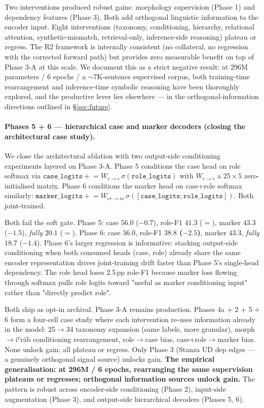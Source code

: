 \documentclass[10pt,a4paper,twocolumn]{article}
\begin{document}
\medskip
\noindent Two interventions produced robust gains: morphology supervision (Phase 1) and dependency features (Phase 3). Both add orthogonal linguistic information to the encoder input. Eight interventions (taxonomy, conditioning, hierarchy, relational attention, synthetic-mismatch, retrieval-only, inference-side reasoning) plateau or regress. The R2 framework is internally consistent (no collateral, no regression with the corrected forward path) but provides zero measurable benefit on top of Phase 3-A at this scale. We document this as a strict negative result: at 296M parameters / 6 epochs / a $\sim$7K-sentence supervised corpus, both training-time rearrangement and inference-time symbolic reasoning have been thoroughly explored, and the productive lever lies elsewhere --- in the orthogonal-information directions outlined in \S\ref{sec:future}.

\paragraph{Phases 5 + 6 --- hierarchical case and marker decoders (closing the architectural case study).}
\label{sec:phase56}
We close the architectural ablation with two output-side conditioning experiments layered on Phase 3-A. Phase 5 conditions the case head on role softmax via $\texttt{case\_logits} \mathrel{+}= W_{r\rightarrow c}\,\sigma(\texttt{role\_logits})$ with $W_{r\rightarrow c}$ a $25 \times 5$ zero-initialised matrix. Phase 6 conditions the marker head on case+role softmax similarly: $\texttt{marker\_logits} \mathrel{+}= W_{cr\rightarrow m}\,\sigma([\texttt{case\_logits};\texttt{role\_logits}])$. Both joint-trained.

Both fail the soft gate. Phase 5: case $56.0$ ($-0.7$), role-F1 $41.3$ ($=$), marker $43.3$ ($-1.5$), \emph{fully} $20.1$ ($=$). Phase 6: case $56.0$, role-F1 \textbf{$38.8$ ($-2.5$)}, marker $43.3$, \emph{fully} $18.7$ ($-1.4$). Phase 6's larger regression is informative: stacking output-side conditioning when both consumed heads (case, role) already share the same encoder representation drives joint-training drift faster than Phase 5's single-head dependency. The role head loses 2.5\,pp role-F1 because marker loss flowing through softmax pulls role logits toward "useful as marker conditioning input" rather than "directly predict role".

Both ship as opt-in archival. Phase 3-A remains production. Phases 4a + 2 + 5 + 6 form a four-cell case study where each intervention re-uses information already in the model: 25$\rightarrow$34 taxonomy expansion (same labels, more granular), morph$\rightarrow$iʿrāb conditioning rearrangement, role$\rightarrow$case bias, case+role$\rightarrow$marker bias. None unlock gain; all plateau or regress. Only Phase 3 (Stanza UD dep edges --- a genuinely orthogonal signal source) unlocks gain. \textbf{The empirical generalisation: at 296M / 6 epochs, rearranging the same supervision plateaus or regresses; orthogonal information sources unlock gain.} The pattern is robust across encoder-side conditioning (Phase 2), input-side augmentation (Phase 3), and output-side hierarchical decoders (Phases 5, 6).
\end{document}
